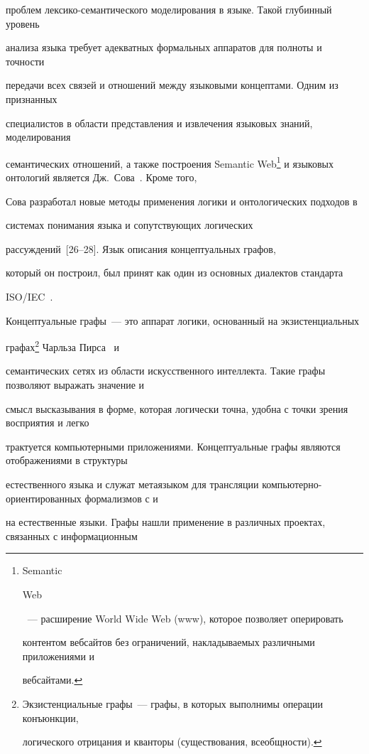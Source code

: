 проблем лексико-семантического моделирования в языке. Такой глубинный уровень 


анализа языка требует адекватных формальных аппаратов для полноты и точности 


передачи всех связей и отношений между языковыми концептами. Одним из признанных 


специалистов в области представления и извлечения языковых знаний, моделирования 


семантических отношений, а также по\-стро\-ения Semantic Web\footnote{{Semantic 


Web}~--- расширение World Wide Web (www), которое позволяет оперировать 


контентом вебсайтов без ограничений, накладываемых различными приложениями и 


вебсайтами.} и языковых онтологий является Дж.~Сова~\cite{25-2-11}. Кроме того, 


Сова разработал новые методы применения логики и онтологических подходов в 


системах понимания языка и сопутствующих логических 


   рассуждений~[26--28]. Язык описания концептуальных графов, 


который он построил, был принят как один из основных диалектов стандарта 


ISO/IEC~\cite{29-2-11}.


   


Концептуальные графы~--- это аппарат логики, основанный на экзистенциальных 


графах\footnote{{Экзистенциальные графы}~--- графы, в которых выполнимы операции конъюнкции, 


логического отрицания и кванторы (существования, всеобщности).} Чарльза Пирса~\cite{30-2-11} и 


семантических сетях из области искусственного интеллекта. Такие графы позволяют выражать значение и 


смысл высказывания в форме, которая логически точна, удобна с точки зрения восприятия и легко 


трактуется компьютерными приложениями. Концептуальные графы являются отображениями в структуры 


естественного языка и служат метаязыком для трансляции компьютерно-ориентированных формализмов с и 


на естественные языки. Графы нашли применение в различных проектах, связанных с информационным 


